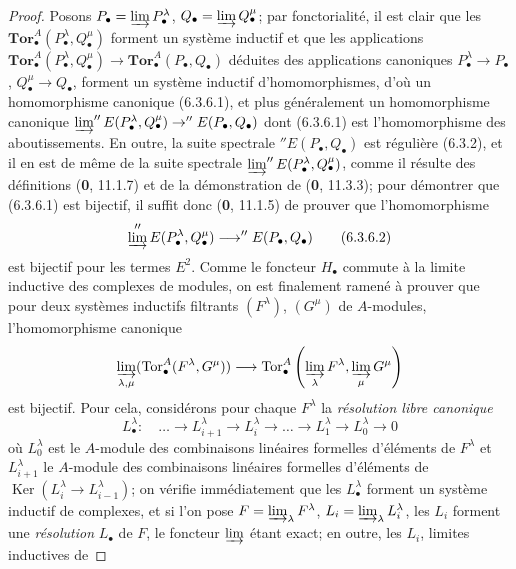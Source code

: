 \begin{proof}
Posons $P_\bullet=\varinjlim P_\bullet^\lambda$,
$Q_\bullet=\varinjlim Q_\bullet^\mu$; par fonctorialité, il est clair que
les $\mathbf{Tor}_\bullet^A(P_\bullet^\lambda,Q_\bullet^\mu)$ forment un
système inductif et que les applications
$\mathbf{Tor}_\bullet^A(P_\bullet^\lambda,Q_\bullet^\mu)\to
\mathbf{Tor}_\bullet^A(P_\bullet,Q_\bullet)$ déduites
des applications canoniques $P_\bullet^\lambda\to P_\bullet$,
$Q_\bullet^\mu\to Q_\bullet$, forment un système inductif d'homomorphismes,
d'où un homomorphisme canonique (6.3.6.1), et plus généralement un
homomorphisme canonique
$\varinjlim''E(P_\bullet^\lambda,Q_\bullet^\mu)\to''E(P_\bullet,Q_\bullet)$
dont (6.3.6.1) est l'homomorphisme des aboutissements. En outre, la suite
spectrale $''E(P_\bullet,Q_\bullet)$ est régulière (6.3.2), et il en est de
même de la suite spectrale
$\varinjlim''E(P_\bullet^\lambda,Q_\bullet^\mu)$, comme il
résulte des définitions (\textbf{0}, 11.1.7) et de la démonstration de (\textbf{0}, 11.3.3);
pour démontrer que (6.3.6.1) est bijectif, il suffit donc (\textbf{0}, 11.1.5) de
prouver que l'homomorphisme
\[
  \varinjlim''E(P_\bullet^\lambda,Q_\bullet^\mu)
  \longrightarrow ''E(P_\bullet,Q_\bullet)
  \tag{6.3.6.2}\label{III.6.3.6.2.fr}
\]
est bijectif pour les termes $E^2$. Comme le foncteur $H_\bullet$ commute à
la limite inductive des complexes de modules, on est finalement ramené à
prouver que pour deux systèmes inductifs filtrants $(F^\lambda)$,
$(G^\mu)$ de $A$-modules, l'homomorphisme canonique
\[
  \varinjlim_{\lambda,\mu}(\operatorname{Tor}_\bullet^A(F^\lambda,G^\mu))
  \longrightarrow
  \operatorname{Tor}_\bullet^A
  \left(\varinjlim_\lambda F^\lambda,
        \varinjlim_\mu G^\mu\right)
\]
est bijectif. Pour cela, considérons pour chaque $F^\lambda$ la \emph{résolution
libre canonique}
\[
  L_\bullet^\lambda:\quad
  \ldots\longrightarrow L_{i+1}^\lambda
  \longrightarrow L_i^\lambda\longrightarrow\ldots
  \longrightarrow L_1^\lambda\longrightarrow L_0^\lambda\longrightarrow0
\]
où $L_0^\lambda$ est le $A$-module des combinaisons linéaires formelles
d'éléments de $F^\lambda$ et $L_{i+1}^\lambda$ le $A$-module des combinaisons
linéaires formelles d'éléments de
$\operatorname{Ker}(L_i^\lambda\to L_{i-1}^\lambda)$; on vérifie
immédiatement que les $L_\bullet^\lambda$ forment un système inductif de
complexes, et si l'on pose
$F=\varinjlim_\lambda F^\lambda$, $L_i=\varinjlim_\lambda L_i^\lambda$, les
$L_i$ forment une \emph{résolution} $L_\bullet$ de $F$, le foncteur
$\varinjlim$ étant exact; en outre, les $L_i$, limites inductives de

\end{proof}

